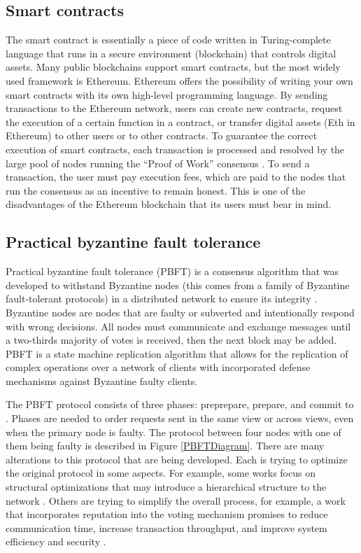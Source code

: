 \subsection{Smart contracts}
\label{Smart contracts}
The smart contract is essentially a piece of code written in Turing-complete language that runs in a secure environment (blockchain) that controls digital assets\cite{BlockchainAndBiometrics}. Many public blockchains support smart contracts, but the most widely used framework is Ethereum. Ethereum offers the possibility of writing your own smart contracts with its own high-level programming language. By sending transactions to the Ethereum network, users can create new contracts, request the execution of a certain function in a contract, or transfer digital assets (Eth in Ethereum) to other users or to other contracts. To guarantee the correct execution of smart contracts, each transaction is processed and resolved by the large pool of nodes running the ``Proof of Work'' consensus \cite{ConsensusInTheWild}. To send a transaction, the user must pay execution fees, which are paid to the nodes that run the consensus as an incentive to remain honest. This is one of the disadvantages of the Ethereum blockchain that its users must bear in mind.

\subsection{Practical byzantine fault tolerance}
Practical byzantine fault tolerance (PBFT) is a consensus algorithm that was developed to withstand Byzantine nodes (this comes from a family of Byzantine fault-tolerant protocols) in a distributed network to ensure its integrity \cite{PBFTCLassification}. Byzantine nodes are nodes that are faulty or subverted and intentionally respond with wrong decisions. All nodes must communicate and exchange messages until a two-thirds majority of votes is received, then the next block may be added. PBFT is a state machine replication algorithm that allows for the replication of complex operations over a network of clients with incorporated defense mechanisms against Byzantine faulty clients. 

The PBFT protocol consists of three phases: preprepare, prepare, and commit to \cite{PBFTAndProactiveRecovery}. Phases are needed to order requests sent in the same view or across views, even when the primary node is faulty. The protocol between four nodes with one of them being faulty is described in Figure \ref{PBFTDiagram}.
There are many alterations to this protocol that are being developed. Each is trying to optimize the original protocol in some aspects. For example, some works focus on structural optimizations that may introduce a hierarchical structure to the network \cite{PBFTCLassification}. Others are trying to simplify the overall process, for example, a work that incorporates reputation into the voting mechanism promises to reduce communication time, increase transaction throughput, and improve system efficiency and security \cite{ImprovedPBFTReputation}.

